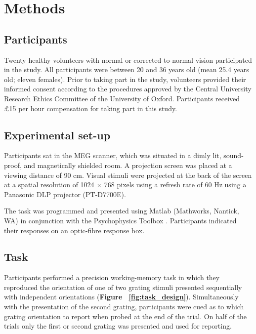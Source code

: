 \documentclass{article}
\begin{document}
\section{Methods}
\subsection{Participants}
Twenty healthy volunteers with normal or corrected-to-normal vision participated in the study. All participants were between 20 and 36 years old (mean 25.4 years old; eleven females). Prior to taking part in the study, volunteers provided their informed consent according to the procedures approved by the Central University Research Ethics Committee of the University of Oxford. Participants received \pounds15 per hour compensation for taking part in this study.\\

\subsection{Experimental set-up}
Participants sat in the MEG scanner, which was situated in a dimly lit, sound-proof, and magnetically shielded room. A projection screen was placed at a viewing distance of 90 cm. Visual stimuli were projected at the back of the screen at a spatial resolution of 1024 $\times$ 768 pixels using a refresh rate of 60 Hz using a Panasonic DLP projector (PT-D7700E). 

The task was programmed and presented using Matlab (Mathworks, Nantick, WA) in conjunction with the Psychophysics Toolbox \parencite{Brainard1997}. Participants indicated their responses on an optic-fibre response box.\\

\subsection{Task}
Participants performed a precision working-memory task in which they reproduced the orientation of one of two grating stimuli presented sequentially with independent orientations (\textbf{Figure ~\ref{fig:task_design}}). Simultaneously with the presentation of the second grating, participants were cued as to which grating orientation to report when probed at the end of the trial. On half of the trials only the first or second grating was presented and used for reporting. 
\end{document}
